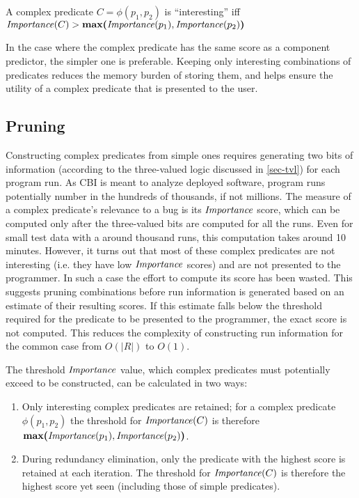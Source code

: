 \begin{defn}
\label{dfn3}
A complex predicate $C = \phi(p_1, p_2)$ is ``interesting'' iff $\mathit{Importance}(C) > \textbf{max(}\mathit{Importance}(p_1), \mathit{Importance}(p_2)\textbf{)}$
\end{defn}

In the case where the complex predicate has the same score as a component predictor, the simpler one is preferable.  Keeping only interesting combinations of predicates reduces the memory burden of storing them, and helps ensure the utility of a complex predicate that is presented to the user.

\subsection{Pruning}
\label{sec-pruning}
Constructing complex predicates from simple ones requires generating two bits of information (according to the three-valued logic discussed in \autoref{sec-tvl}) for each program run.  As CBI is meant to analyze deployed software, program runs potentially number in the hundreds of thousands, if not millions.  The measure of a complex predicate's relevance to a bug is its $\mathit{Importance}$ score, which can be computed only after the three-valued bits are computed for all the runs.  Even for small test data with a around thousand runs, this computation takes around 10 minutes.  However, it turns out that most of these complex predicates are not interesting (i.e. they have low $\mathit{Importance}$ scores) and are not presented to the programmer.  In such a case the effort to compute its score has been wasted.  This suggests pruning combinations before run information is generated based on an estimate of their resulting scores.  If this estimate falls below the threshold required for the predicate to be presented to the programmer, the exact score is not computed.  This reduces the complexity of constructing run information for the common case from $O(|R|)$ to $O(1)$.

The threshold $\mathit{Importance}$ value, which complex predicates must potentially exceed to be constructed, can be calculated in two ways:
\begin{enumerate}
\item Only interesting complex predicates are retained; for a complex predicate $\phi(p_1, p_2)$ the threshold for $\mathit{Importance}(C)$ is therefore $\textbf{max(}\mathit{Importance}(p_1), \mathit{Importance}(p_2)\textbf{)}$.
\item During redundancy elimination, only the predicate with the highest score is retained at each iteration.  The threshold for $\mathit{Importance}(C)$ is therefore the highest score yet seen (including those of simple predicates).
\end{enumerate}

